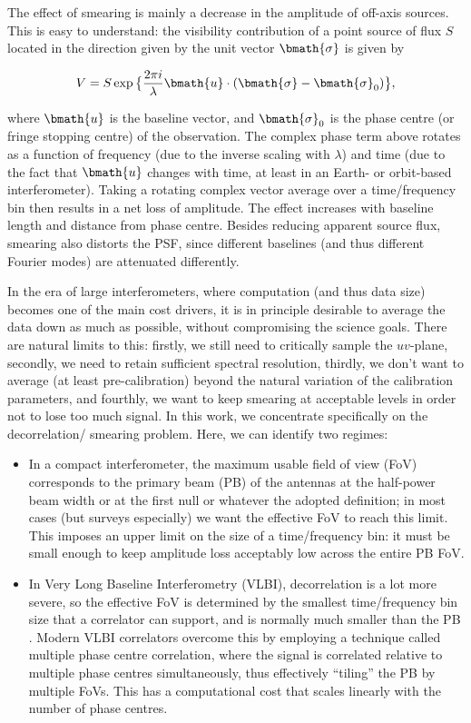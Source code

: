 \documentclass[useAMS,usenatbib]{mn2e}
\begin{document}
The effect of smearing is mainly a decrease in the amplitude of off-axis sources. This is easy to understand: the visibility contribution of a point source of flux $S$ located in the direction given by the unit vector $\bmath{\sigma}$ is given by

\begin{equation}
V = S \exp \big \{  \frac{2\pi i}{\lambda} \bmath{u}\cdot(\bmath{\sigma}-\bmath{\sigma}_0) \big \},
\end{equation}

where $\bmath{u}$ is the baseline vector, and $\bmath{\sigma}_0$ is the phase centre (or fringe stopping centre) of the observation.
The complex phase term above rotates as a function of frequency (due to the inverse scaling with $\lambda$) and time (due to
the fact that $\bmath{u}$ changes with time, at least in an Earth- or orbit-based interferometer). 
Taking a rotating complex vector average over a time/frequency bin then results  in a net loss of amplitude. The effect increases 
with baseline length and distance from phase centre. Besides reducing apparent source flux, smearing also distorts the PSF, since different baselines (and thus different Fourier modes) are attenuated differently.

In the era of large interferometers, where computation (and thus data size) becomes one of the main cost drivers, it is 
in principle desirable to average the data down as much as possible, without compromising the science goals. There are natural limits to this: firstly, we still need to critically sample the $uv$-plane, secondly, we need to retain sufficient spectral resolution, thirdly, we don't want to average (at least pre-calibration) beyond the natural variation of the calibration parameters, and fourthly, we want to keep smearing at acceptable levels in order not to lose too much signal. In this work, we concentrate specifically on the decorrelation/
smearing problem. Here, we can identify two regimes:

\begin{itemize}
\item In a compact interferometer, the maximum usable field of view (FoV) corresponds to the primary beam (PB) of the antennas at the half-power beam width or at the first null or whatever the adopted definition; in
most cases (but surveys especially) we want the effective FoV to reach this limit. This imposes an upper limit on the size of a 
time/frequency bin: it must be small enough to keep amplitude loss acceptably low across the entire PB FoV. 
\item In Very Long Baseline Interferometry (VLBI), decorrelation is a lot more severe, so the effective FoV is determined by the smallest time/frequency bin size that a
correlator can support, and is normally much smaller than the PB \citep[for an extensive discussion see][]{keipema2015sfxc}. Modern VLBI correlators overcome this by employing a technique 
called multiple phase centre correlation, where the signal is correlated relative to multiple phase centres simultaneously, thus
effectively ``tiling'' the PB by multiple FoVs. This has a computational cost that scales linearly with the number of phase centres.
\end{itemize}
\end{document}
